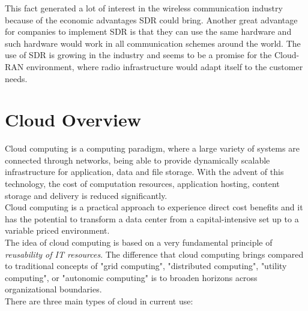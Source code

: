 This fact generated a lot of interest in the wireless communication industry
because of the economic advantages SDR could bring. Another great advantage for
companies to implement SDR is that they can use the same hardware and such
hardware would work in all communication schemes around the world. The use of
SDR is growing in the industry and seems to be a promise for the Cloud-RAN
environment, where radio infrastructure would adapt itself to the customer
needs.

\section{Cloud Overview}
\label{sec:sdr_cloud}

Cloud computing is a computing paradigm, where a large variety of systems are
connected through networks, being able to provide dynamically scalable
infrastructure for application, data and file storage. With the advent of this
technology, the cost of computation resources, application hosting, content
storage and delivery is reduced significantly. \\

Cloud computing is a practical approach to experience direct cost benefits and
it has the potential to transform a data center from a capital-intensive set up
to a variable priced environment. \\

The idea of cloud computing is based on a very fundamental principle of
\emph{reusability of IT resources}. The difference that cloud computing brings
compared to traditional concepts of "grid computing", "distributed computing",
"utility computing", or "autonomic computing" is to broaden horizons across
organizational boundaries.\\

There are three main types of cloud in current use:

